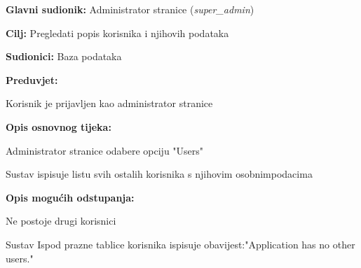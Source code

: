 			\begin{packed_item}
				
				\item \textbf{Glavni sudionik: }Administrator stranice (\textit{super\_admin})
				\item  \textbf{Cilj: }Pregledati popis korisnika i njihovih podataka
				\item  \textbf{Sudionici: }Baza podataka
				\item  \textbf{Preduvjet: }
				\begin{packed_enum}\item Korisnik je prijavljen kao administrator stranice\end{packed_enum}
				\item  \textbf{Opis osnovnog tijeka: }
				
				\item[] \begin{packed_enum}
					
					\item Administrator stranice odabere opciju "Users"
					\item Sustav ispisuje listu svih ostalih korisnika s njihovim osobnim\newline podacima
					
				\end{packed_enum}
				
				\item  \textbf{Opis mogućih odstupanja: }
				
				\item[] \begin{packed_item}
					
					\item[1] Ne postoje drugi korisnici
					\item[ ] \begin{packed_enum}
						
						\item[1.1] Sustav Ispod prazne tablice korisnika ispisuje obavijest:\newline "Application has no other users."
						
					\end{packed_enum}
					
				\end{packed_item}
			\end{packed_item}
			
